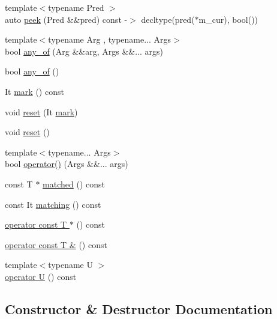 \begin{DoxyCompactItemize}
\item 
{\footnotesize template$<$typename Pred $>$ }\\auto \hyperlink{class_matcher_a4c92e3958c64eee29812f4ed75c331cf}{peek} (Pred \&\&pred) const -\/$>$ decltype(pred($\ast$m\+\_\+cur), bool())
\item 
{\footnotesize template$<$typename Arg , typename... Args$>$ }\\bool \hyperlink{class_matcher_a1db8b27d158ba0010bf7c69559773112}{any\+\_\+of} (Arg \&\&arg, Args \&\&... args)
\item 
bool \hyperlink{class_matcher_a6cfab4944429c85a33d872691e0976c8}{any\+\_\+of} ()
\item 
It \hyperlink{class_matcher_af9135752ac195a21c230267d52db6623}{mark} () const
\item 
void \hyperlink{class_matcher_abb67aa2acac25b34d80ffb2e64eef44c}{reset} (It \hyperlink{class_matcher_af9135752ac195a21c230267d52db6623}{mark})
\item 
void \hyperlink{class_matcher_a18de8d97996c28deb6ac787f2a0981a6}{reset} ()
\item 
{\footnotesize template$<$typename... Args$>$ }\\bool \hyperlink{class_matcher_a2c1cbd69f6fcbbcf40e9e66333cfddca}{operator()} (Args \&\&... args)
\item 
const T $\ast$ \hyperlink{class_matcher_a6a43511495d338b4572dcb52e96fc3a3}{matched} () const
\item 
const It \hyperlink{class_matcher_abf9d0a1f24372dc9dde031ae6df26921}{matching} () const
\item 
\hyperlink{class_matcher_ae3f74b07e355126855e40db722c7a51d}{operator const T $\ast$} () const
\item 
\hyperlink{class_matcher_a7b808eac9d5d10c2d417869bf630d6ec}{operator const T \&} () const
\item 
{\footnotesize template$<$typename U $>$ }\\\hyperlink{class_matcher_a0bd21eb19304624235c6cb208fa1216a}{operator U} () const
\end{DoxyCompactItemize}


\subsection{Constructor \& Destructor Documentation}
\mbox{\label{class_matcher_a6a90be25ea49908ed9d6c23f8bb9c47f}} 
